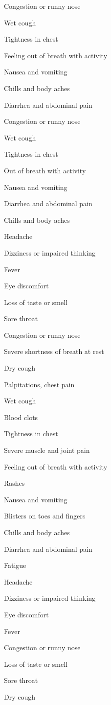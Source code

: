 Congestion or runny nose

Wet cough

Tightness in chest

Feeling out of breath with activity

Nausea and vomiting

Chills and body aches

Diarrhea and abdominal pain

Congestion or runny nose

Wet cough

Tightness in chest

Out of breath with activity

Nausea and vomiting

Diarrhea and abdominal pain

Chills and body aches

Headache

Dizziness or impaired thinking

Fever

Eye discomfort

Loss of taste or smell

Sore throat

Congestion or runny nose

Severe shortness of breath at rest

Dry cough

Palpitations, chest pain

Wet cough

Blood clots

Tightness in chest

Severe muscle and joint pain

Feeling out of breath with activity

Rashes

Nausea and vomiting

Blisters on toes and fingers

Chills and body aches

Diarrhea and abdominal pain

Fatigue

Headache

Dizziness or impaired thinking

Eye discomfort

Fever

Congestion or runny nose

Loss of taste or smell

Sore throat

Dry cough

